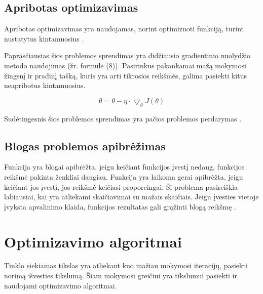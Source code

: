 \documentclass{VUMIFInfKursinis}
\begin{document}
\subsection{Apribotas optimizavimas}
Apribotas optimizavimas yra naudojamas, norint optimizuoti funkciją,
turint nustatytus kintamuosius \cite{salt7}.
\par
Paprasčiausias šios problemos sprendimas yra didžiausio gradientinio nuolydžio
metodo naudojimas (žr. formulė (8)). Pasirinkus pakankamai mažą mokymosi žingsnį ir pradinį tašką, kuris
yra arti tikrosios reikšmės, galima pasiekti kitus neapribotus kintamuosius.

\begin{equation}
\theta = \theta - \eta \cdot \bigtriangledown_{\theta}J(\theta)
\end{equation}

\par
Sudėtingesnis šios problemos sprendimas yra pačios problemos perdarymas \cite{salt7}.

\subsection{Blogas problemos apibrėžimas}

Funkcija yra blogai apibrėžta, jeigu keičiant funkcijos įvestį nedaug, funkcijos reikšmė
pakinta ženkliai daugiau. Funkcija yra laikoma gerai apibrėžta, jeigu keičiant jos įvestį,
jos reikšmė keičiasi proporcingai. Ši problema pasireiškia labiausiai, kai yra
atliekami skaičiavimai su mažais skaičiais. Jeigu įvesties vietoje įvyksta apvalinimo
klaida, funkcijos rezultatas gali grąžinti blogą reikšmę \cite{salt7}.









\section{Optimizavimo algoritmai}
\par
Tinklo siekiamas tikslas yra atliekant kuo mažiau mokymosi iteracijų, pasiekti norimą
išvesties tikslumą. Šiam mokymosi greičiui yra tikslumui pasiekti ir naudojami
optimizavimo algoritmai.
\end{document}
